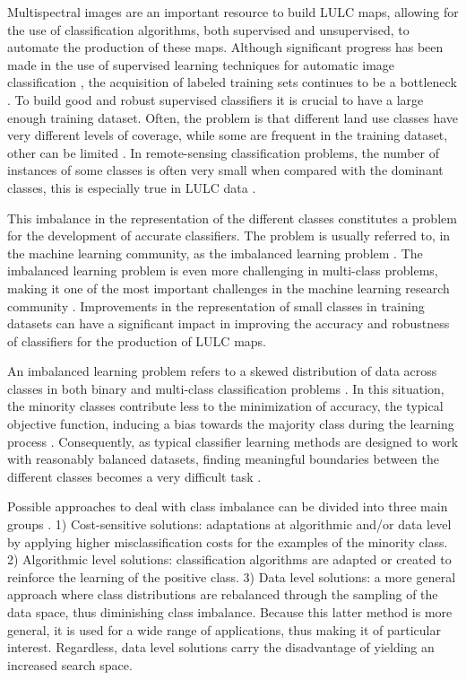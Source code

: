 \documentclass[parskip=full]{scrartcl}
\begin{document}
Multispectral images are an important resource to build LULC maps, allowing for
the use of classification algorithms, both supervised and unsupervised, to
automate the production of these maps. Although significant progress has been
made in the use of supervised learning techniques for automatic image
classification \cite{Tewkesbury2015}, the acquisition of labeled training sets
continues to be a bottleneck \cite{Rajan2008}. To build  good and robust
supervised classifiers it is crucial to have a large enough training dataset.
Often, the problem is that different land use classes have very different
levels of coverage, while some are frequent in the training dataset, other can
be limited \cite{Feng2019}. In remote-sensing classification problems, the
number of instances of some classes is often very small when compared with the
dominant classes, this is especially true in LULC data \cite{Williams2009,
Cenggoro2018}.

This imbalance in the representation of the different classes constitutes a
problem for the development of accurate classifiers. The problem is usually
referred to, in the machine learning community, as the imbalanced learning
problem \cite{Chawla2004}. The imbalanced learning problem is even more
challenging in multi-class problems, making it one of the most
important challenges in the machine learning research community
\cite{Garcia2018}. Improvements in the representation of small classes in
training datasets can have a significant impact in improving the accuracy and
robustness of classifiers for the production of LULC maps.

An imbalanced learning problem refers to a skewed distribution of data across
classes in both binary and multi-class classification problems \cite{Abdi2016}.
In this situation, the minority classes contribute less to the minimization of
accuracy, the typical objective function, inducing a bias towards the majority
class during the learning process \cite{Douzas2019}. Consequently, as typical
classifier learning methods are designed to work with reasonably balanced
datasets, finding meaningful boundaries between the different classes becomes a
very difficult task \cite{Saez2016}.

Possible approaches to deal with class imbalance can be divided into three main
groups \cite{Fernandez2013}. 1) Cost-sensitive solutions: adaptations at
algorithmic and/or data level by applying higher misclassification costs for the
examples of the minority class. 2) Algorithmic level solutions: classification
algorithms are adapted or created to reinforce the learning of the positive
class. 3) Data level solutions: a more general approach where class
distributions are rebalanced through the sampling of the data space, thus
diminishing class imbalance. Because this latter method is more general, it is
used for a wide range of applications, thus making it of particular interest.
Regardless, data level solutions carry the disadvantage of yielding an increased
search space.
\end{document}
